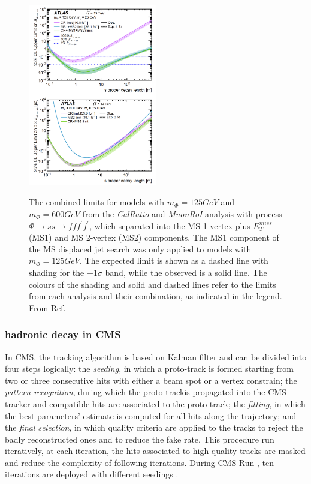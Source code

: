\begin{figure}[!htbp]
    \centering
    \caption{The combined limits for models with $m_\Phi = 125 GeV$ and $m_\Phi = 600 GeV$ from the \textit{CalRatio} and \textit{MuonRoI} analysis with process $\Phi \rightarrow ss \rightarrow fff^{'}f^{'}$, which separated into the MS 1-vertex plus $E_T^{miss}$ (MS1) and MS 2-vertex (MS2) components. The MS1 component of the MS displaced jet search was only applied to models with $m_\Phi = 125 GeV$. The expected limit is shown as a dashed line with shading for the $\pm 1\sigma$ band, while the observed is a solid line. The colours of the shading and solid and dashed lines refer to the limits from each analysis and their combination, as indicated in the legend. From Ref.\cite{Aaboud:2019opc} }
    \includegraphics[width=0.5\textwidth]{fig/NeutralLLPinATLAScal.png}
    \label{fig:NeutralLLPinATLAScalSummary}
\end{figure}

\subsubsection{hadronic decay in CMS}

In CMS, the tracking algorithm is based on Kalman filter and can be divided into four steps logically: the \textit{seeding}, in which a proto-track is formed starting from two or three consecutive hits with either a beam spot or a vertex constrain; the \textit{pattern recognition}, during which the proto-trackis propagated into the CMS tracker and compatible hits are associated to the proto-track; the \textit{fitting}, in which the best parameters’ estimate is computed for all hits along the  trajectory; and the \textit{final selection}, in which quality criteria are applied to the tracks to reject the badly reconstructed ones and to reduce the fake rate. This procedure run iteratively, at each iteration, the hits associated to high quality tracks are masked and reduce the complexity of following iterations. During CMS Run , ten iterations are deployed with different seedings \cite{CMSPFreconstruction}.


